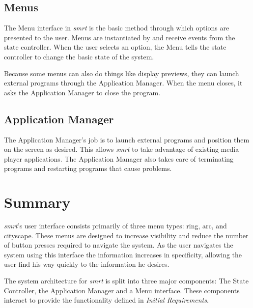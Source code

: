 \documentclass[letterpaper, twoside, titlepage, 11pt]{article}
\begin{document}
\subsection{Menus}
The Menu interface in \textit{smrt} is the basic method through which options
are presented to the user.  Menus are instantiated by and receive events from
the state controller.  When the user selects an option, the Menu tells the
state controller to change the basic state of the system.

Because some menus can also do things like display previews, they can launch
external programs through the Application Manager.  When the menu closes, it
asks the Application Manager to close the program.

\subsection{Application Manager}
The Application Manager's job is to launch external programs and position
them on the screen as desired.  This allows \textit{smrt} to take advantage of
existing media player applications.  The Application Manager also takes care
of terminating programs and restarting programs that cause problems.

\section{Summary}
\textit{smrt}'s user interface consists primarily of three menu types: ring,
arc, and cityscape. These menus are designed to increase visibility and reduce
the number of button presses required to navigate the system. As the user
navigates the system using this interface the information increases in
specificity, allowing the user find his way quickly to the information he
desires.

The system architecture for \textit{smrt} is split into three major components:
The State Controller, the Application Manager and a Menu interface.  These
components interact to provide the functionality defined in
\textit{Initial Requirements}.

\end{document}
